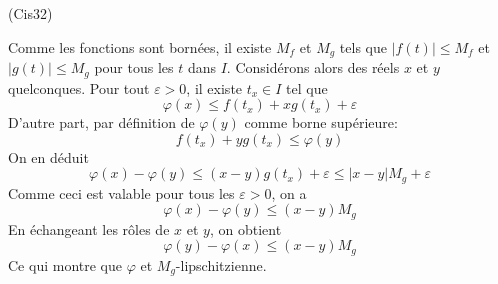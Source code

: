 \begin{tiny}(Cis32)\end{tiny} Comme les fonctions sont bornées, il existe $M_f$ et $M_g$ tels que $|f(t)|\leq M_f$ et $|g(t)|\leq M_g$ pour tous les $t$ dans $I$. Considérons alors des réels $x$ et $y$ quelconques. Pour tout $\varepsilon >0$, il existe $t_x\in I$ tel que
\begin{displaymath}
 \varphi(x) \leq f(t_x) + xg(t_x) + \varepsilon
\end{displaymath}
 D'autre part, par définition de $\varphi(y)$ comme borne supérieure:
\begin{displaymath}
  f(t_x) + yg(t_x) \leq \varphi(y)
\end{displaymath}
On en déduit
\begin{displaymath}
 \varphi(x) - \varphi(y) \leq (x-y)g(t_x)+\varepsilon
\leq |x-y|M_g+\varepsilon
\end{displaymath}
Comme ceci est valable pour tous les $\varepsilon >0$, on a
\begin{displaymath}
 \varphi(x) - \varphi(y) \leq (x-y)M_g
\end{displaymath}
En échangeant les rôles de $x$ et $y$, on obtient
\begin{displaymath}
 \varphi(y) - \varphi(x) \leq (x-y)M_g
\end{displaymath}
Ce qui montre que $\varphi$ et $M_g$-lipschitzienne.